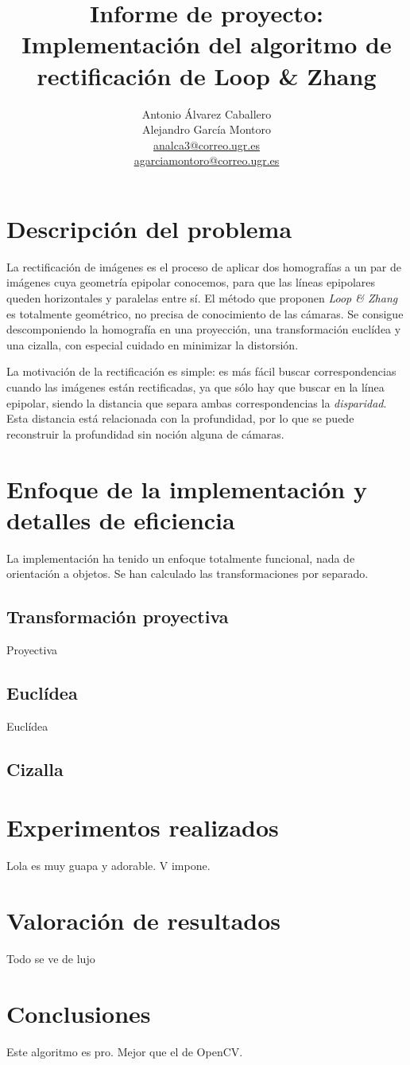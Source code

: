 \documentclass[a4paper, 11pt]{article}
\title{Informe de proyecto: \\ Implementación del algoritmo de rectificación de Loop \& Zhang}
\author{Antonio Álvarez Caballero \\ Alejandro García Montoro \\
    \href{mailto:analca3@correo.ugr.es}{analca3@correo.ugr.es} \\
    \href{mailto:agarciamontoro@correo.ugr.es}{agarciamontoro@correo.ugr.es}}
\date{}
\theoremstyle{definition}
\begin{document}
  \maketitle

  \section{Descripción del problema}

    La rectificación de imágenes es el proceso de aplicar dos homografías a un par
    de imágenes cuya geometría epipolar conocemos, para que las líneas epipolares
    queden horizontales y paralelas entre sí. El método que proponen \emph{Loop \& Zhang}
    es totalmente geométrico, no precisa de conocimiento de las cámaras.
    Se consigue descomponiendo la homografía en una proyección, una transformación
    euclídea y una cizalla, con especial cuidado en minimizar la distorsión.

    La motivación de la rectificación es simple: es más fácil buscar correspondencias
    cuando las imágenes están rectificadas, ya que sólo hay que buscar en la línea
    epipolar, siendo la distancia que separa ambas correspondencias la \emph{disparidad}.
    Esta distancia está relacionada con la profundidad, por lo que se puede reconstruir
    la profundidad sin noción alguna de cámaras.

    \section{Enfoque de la implementación y detalles de eficiencia}

      La implementación ha tenido un enfoque totalmente funcional, nada de orientación
      a objetos. Se han calculado las transformaciones por separado.

      \subsection{Transformación proyectiva}
      Proyectiva

      \subsection{Euclídea}
      Euclídea

      \subsection{Cizalla}

    \section{Experimentos realizados}

      Lola es muy guapa y adorable. V impone.

    \section{Valoración de resultados}

      Todo se ve de lujo

    \section{Conclusiones}

      Este algoritmo es pro. Mejor que el de OpenCV.
\end{document}
